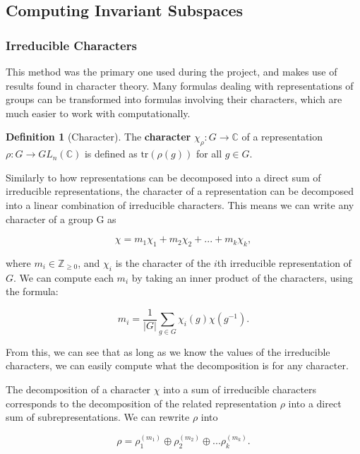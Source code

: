 \documentclass[11pt]{article} %
\theoremstyle{definition}
\newtheorem{definition}[theorem]{Definition}
\theoremstyle{remark}
\begin{document}
\subsection{Computing Invariant Subspaces}

\subsubsection{Irreducible Characters} \label{charmethod}

This method was the primary one used during the project, and makes use of results found in character theory. Many formulas dealing with representations of groups can be transformed into formulas involving their characters, which are much easier to work with computationally.

\begin{definition}[Character] 
The \textbf{character} $\chi_\rho : G \rightarrow \mathbb{C}$ of a representation $\rho : G \rightarrow GL_n(\mathbb{C})$ is defined as $\textrm{tr}(\rho(g))$ for all $g \in G$.
\end{definition}

Similarly to how representations can be decomposed into a direct sum of irreducible representations, the character of a representation can be decomposed into a linear combination of irreducible characters. This means we can write any character of a group G as

	$$ \chi = m_1\chi_1 + m_2\chi_2 + ... + m_k\chi_k, $$

where $m_i \in \mathbb{Z}_{\geq 0}$, and $\chi_i$ is the character of the $i$th irreducible representation of $G$. We can compute each $m_i$ by taking an inner product of the characters, using the formula:

\begin{equation}
m_i = \frac{1}{|G|} \sum_{g \in G} \chi_i(g) \chi(g^{-1}).
\end{equation}

From this, we can see that as long as we know the values of the irreducible characters, we can easily compute what the decomposition is for any character.

The decomposition of a character $\chi$ into a sum of irreducible characters corresponds to the decomposition of the related representation $\rho$ into a direct sum of subrepresentations. We can rewrite $\rho$ into

	$$ \rho = \rho_1^{(m_1)} \oplus \rho_2^{(m_2)} \oplus ... \rho_k^{(m_k)}. $$
\end{document}

